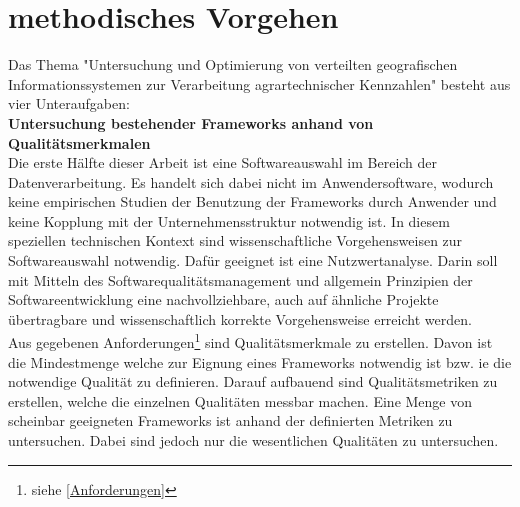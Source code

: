 \chapter{methodisches Vorgehen}



Das Thema "Untersuchung und Optimierung von verteilten geografischen Informationssystemen zur Verarbeitung agrartechnischer Kennzahlen" besteht aus vier Unteraufgaben:\\

\textbf{Untersuchung bestehender Frameworks anhand von Qualitätsmerkmalen}\\
Die erste Hälfte dieser Arbeit ist eine Softwareauswahl im Bereich der Datenverarbeitung.
Es handelt sich dabei nicht im Anwendersoftware, wodurch keine empirischen Studien der Benutzung der Frameworks durch Anwender und keine Kopplung mit der Unternehmensstruktur notwendig ist.
In diesem speziellen technischen Kontext sind wissenschaftliche Vorgehensweisen zur Softwareauswahl notwendig.
Dafür geeignet ist eine Nutzwertanalyse.
Darin soll mit Mitteln des Softwarequalitätsmanagement und allgemein Prinzipien der Softwareentwicklung eine nachvollziehbare, auch auf ähnliche Projekte übertragbare und wissenschaftlich korrekte Vorgehensweise erreicht werden.\\
Aus gegebenen Anforderungen\footnote{siehe \ref{Anforderungen}} sind Qualitätsmerkmale zu erstellen.
Davon ist die Mindestmenge welche zur Eignung eines Frameworks notwendig ist bzw. ie die notwendige  Qualität zu definieren.
Darauf aufbauend sind Qualitätsmetriken zu erstellen, welche die einzelnen Qualitäten messbar machen.
Eine Menge von scheinbar geeigneten Frameworks ist anhand der definierten Metriken zu untersuchen.
Dabei sind jedoch nur die wesentlichen Qualitäten zu untersuchen.

